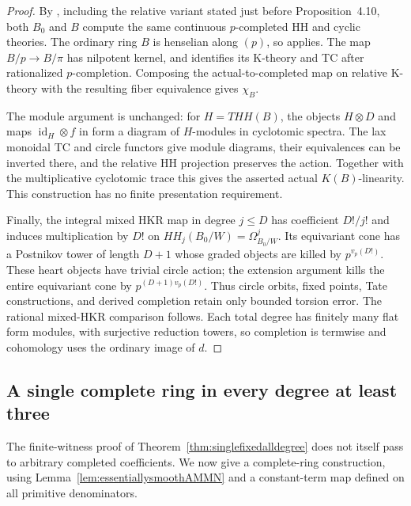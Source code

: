 \documentclass[11pt,a4paper]{article}
\theoremstyle{remark}
\begin{document}
\begin{proof}
By \cite[Proposition~4.2]{AMMN}, including the relative variant
stated just before Proposition~4.10, both $B_0$ and $B$ compute
the same continuous $p$-completed HH and cyclic theories.
The ordinary ring $B$ is henselian along $(p)$, so
\cite[Theorem~A]{AMMN} applies. The map $B/p\to B/\pi$ has
nilpotent kernel, and \cite[Corollary~3.8]{AMMN} identifies its
K-theory and TC after rationalized $p$-completion. Composing the
actual-to-completed map on relative K-theory with the resulting
fiber equivalence gives $\chi_B$.

The module argument is unchanged: for $H=THH(B)$, the objects
$H\otimes D$ and maps $\operatorname{id}_H\otimes f$ in
\cite[Proposition~2.8, Corollary~2.10, and Theorem~2.12]{AMMN}
form a diagram of $H$-modules in cyclotomic spectra.
The lax monoidal TC and circle functors give module diagrams,
their equivalences can be inverted there, and the relative HH
projection preserves the action. Together with the
multiplicative cyclotomic trace this gives the asserted actual
$K(B)$-linearity. This construction has no finite presentation
requirement.

Finally, the integral mixed HKR map in degree $j\le D$ has
coefficient $D!/j!$ and induces multiplication by $D!$ on
$HH_j(B_0/W)=\Omega^j_{B_0/W}$. Its equivariant cone has a
Postnikov tower of length $D+1$ whose graded objects are killed
by $p^{v_p(D!)}$. These heart objects have trivial circle action;
the extension argument kills the entire equivariant cone by
$p^{(D+1)v_p(D!)}$. Thus circle orbits, fixed points, Tate
constructions, and derived completion retain only bounded
torsion error. The rational mixed-HKR comparison follows.
Each total degree has finitely many flat form modules, with
surjective reduction towers, so completion is termwise and
cohomology uses the ordinary image of $d$.
\end{proof}


\subsection{A single complete ring in every degree at least three}
\label{sec:completedfixedalldegree}

The finite-witness proof of Theorem~\ref{thm:singlefixedalldegree}
does not itself pass to arbitrary completed coefficients.  We now
give a complete-ring construction, using
Lemma~\ref{lem:essentiallysmoothAMMN} and a constant-term map
defined on all primitive denominators.
\end{document}
